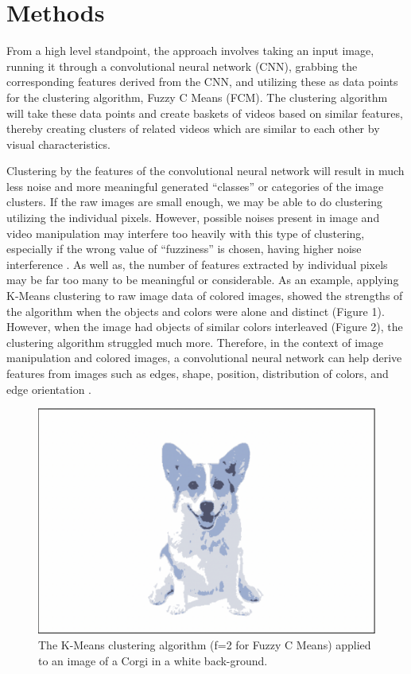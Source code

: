 \documentclass[10pt,twocolumn]{article}
\begin{document}
\section {Methods}

From a high level standpoint, the approach involves taking an input image, running it through a convolutional neural network (CNN), grabbing the corresponding features derived from the CNN, and utilizing these as data points for the clustering algorithm, Fuzzy C Means (FCM). The clustering algorithm will take these data points and create baskets of videos based on similar features, thereby creating clusters of related videos which are similar to each other by visual characteristics. 

Clustering by the features of the convolutional neural network will result in much less noise and more meaningful generated “classes” or categories of the image clusters. If the raw images are small enough, we may be able to do clustering utilizing the individual pixels. However, possible noises present in image and video manipulation may interfere too heavily with this type of clustering, especially if the wrong value of “fuzziness” is chosen, having higher noise interference \cite{Zhang2019}. As well as, the number of features extracted by individual pixels may be far too many to be meaningful or considerable. As an example, applying K-Means clustering to raw image data of colored images, showed the strengths of the algorithm when the objects and colors were alone and distinct (Figure 1). However, when the image had objects of similar colors interleaved (Figure 2), the clustering algorithm struggled much more. Therefore, in the context of image manipulation and colored images, a convolutional neural network can help derive features from images such as edges, shape, position, distribution of colors, and edge orientation \cite{Lavrenko2014}.

\begin{figure}[h]
 \centering
 \includegraphics[scale=0.2]{corgi-white.png}
 \vspace{20px}
 \caption{The K-Means clustering algorithm (f=2 for Fuzzy C Means) applied to an image of a Corgi in a white back-ground.}
 \label{corgi:white}
\end{figure}
\end{document}
